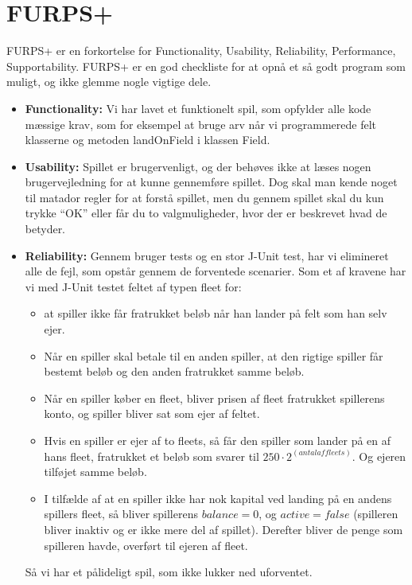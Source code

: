 \section*{FURPS+}
FURPS+ er en forkortelse for Functionality, Usability, Reliability, Performance,
Supportability. FURPS+ er en god checkliste for at opnå et så godt program som
muligt, og ikke glemme nogle vigtige dele.
\begin{itemize}
  \item \textbf{Functionality:} Vi har lavet et funktionelt spil, som opfylder
  alle kode mæssige krav, som for eksempel at bruge arv når vi programmerede felt
  klasserne og metoden landOnField i klassen Field.
  \item \textbf{Usability:} Spillet er brugervenligt, og der behøves ikke at
  læses nogen brugervejledning for at kunne gennemføre spillet. Dog skal man
  kende noget til matador regler for at forstå spillet, men du gennem spillet
  skal du kun trykke “OK” eller får du to valgmuligheder, hvor der er beskrevet
  hvad de betyder.
  \item \textbf{Reliability:} Gennem bruger tests og en stor J-Unit test, har vi
  elimineret alle de fejl, som opstår gennem de forventede scenarier. Som et af
  kravene har vi med J-Unit testet feltet af typen fleet for:
  \begin{itemize}
    \item at spiller ikke får fratrukket beløb når han lander på felt som han
    selv ejer.
    \item Når en spiller skal betale til en anden spiller, at den rigtige
    spiller får bestemt beløb og den anden fratrukket samme beløb.
    \item Når en spiller køber en fleet, bliver prisen af fleet fratrukket
    spillerens konto, og spiller bliver sat som ejer af feltet.
    \item Hvis en spiller er ejer af to fleets, så får den spiller som lander på
    en af hans fleet, fratrukket et beløb som svarer til $250 \cdot 2^(antal af
    fleets)$. Og ejeren tilføjet samme beløb.
    \item I tilfælde af at en spiller ikke har nok kapital ved landing på en
    andens spillers fleet, så bliver spillerens $balance = 0$, og
    $active = false$ (spilleren bliver inaktiv og er ikke mere del af
    spillet). Derefter bliver de penge som spilleren havde, overført til ejeren
    af fleet.
  \end{itemize}
  Så vi har et pålideligt spil, som ikke lukker ned uforventet.

\end{itemize}
